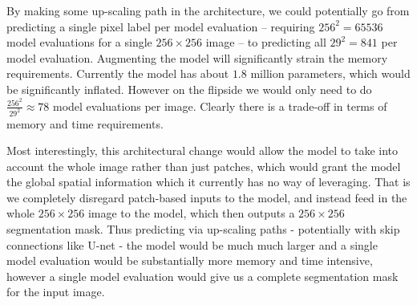 By making some up-scaling path in the architecture, we could potentially go from predicting a single pixel label
per model evaluation -- requiring $256^2=65536$ model evaluations for a single $256 \times 256 $ image
-- to predicting all $29^2=841$ per model evaluation.
Augmenting the model will significantly strain the memory requirements. Currently the model has
about $1.8$ million parameters, which would be significantly inflated.
However on the flipside we would only need to do $\frac{256^2}{29^2} \approx 78$ model evaluations per image.
Clearly there is a trade-off in terms of memory and time requirements.

Most interestingly, this architectural change would allow the model to take into account
the whole image rather than just patches, which would grant the model the global spatial information
which it currently has no way of leveraging.
That is we completely disregard patch-based inputs to the model, and instead feed in the whole $256 \times 256$ image
to the model, which then outputs a $256 \times 256$ segmentation mask.
Thus predicting via up-scaling paths - potentially with skip connections like U-net -
the model would be much much larger and a single model evaluation would be substantially more memory and time intensive,
however a single model evaluation would give us a complete segmentation mask for the input image.
